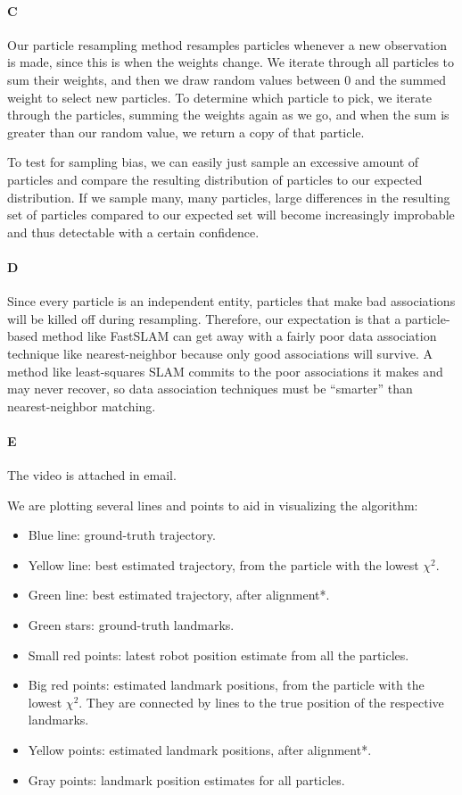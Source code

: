 \documentclass[12pt]{article}
\begin{document}
\paragraph{C} %
Our particle resampling method resamples particles whenever a new observation
is made, since this is when the weights change. We iterate through all
particles to sum their weights, and then we draw random values between 0 and
the summed weight to select new particles. To determine which particle to pick,
we iterate through the particles, summing the weights again as we go, and when
the sum is greater than our random value, we return a copy of that particle.

To test for sampling bias, we can easily just sample an excessive amount of
particles and compare the resulting distribution of particles to our
expected distribution. If we sample many, many particles, large differences
in the resulting set of particles compared to our expected set will become
increasingly improbable and thus detectable with a certain confidence.

\paragraph{D}
Since every particle is an independent entity, particles that make bad
associations will be killed off during resampling. Therefore, our
expectation is that a particle-based method like FastSLAM can get away
with a fairly poor data association technique like nearest-neighbor
because only good associations will survive. A method like least-squares
SLAM commits to the poor associations it makes and may never recover, so
data association techniques must be ``smarter'' than nearest-neighbor
matching.

\paragraph{E}
The video is attached in email.

We are plotting several lines and points to aid in visualizing the algorithm:
\begin{itemize}
	\item Blue line: ground-truth trajectory.
	\item Yellow line: best estimated trajectory, from the particle with the lowest $\chi^2$.
	\item Green line: best estimated trajectory, after alignment*.
	\item Green stars: ground-truth landmarks.
	\item Small red points: latest robot position estimate from all the particles.
	\item Big red points: estimated landmark positions, from the particle with the lowest $\chi^2$. They are connected by lines to the true position of the respective landmarks.
	\item Yellow points: estimated landmark positions, after alignment*.
	\item Gray points: landmark position estimates for all particles.
\end{itemize}
\end{document}

